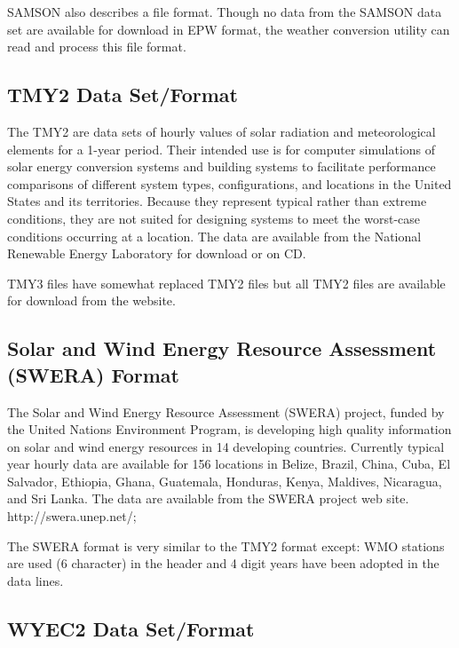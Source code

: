 SAMSON also describes a file format. Though no data from the SAMSON data set are available for download in EPW format, the weather conversion utility can read and process this file format.

\subsection{TMY2 Data Set/Format}\label{tmy2-data-setformat}

The TMY2 are data sets of hourly values of solar radiation and meteorological elements for a 1-year period. Their intended use is for computer simulations of solar energy conversion systems and building systems to facilitate performance comparisons of different system types, configurations, and locations in the United States and its territories. Because they represent typical rather than extreme conditions, they are not suited for designing systems to meet the worst-case conditions occurring at a location. The data are available from the National Renewable Energy Laboratory for download or on CD.

TMY3 files have somewhat replaced TMY2 files but all TMY2 files are available for download from the website.

\subsection{Solar and Wind Energy Resource Assessment (SWERA) Format}\label{solar-and-wind-energy-resource-assessment-swera-format}

The Solar and Wind Energy Resource Assessment (SWERA) project, funded by the United Nations Environment Program, is developing high quality information on solar and wind energy resources in 14 developing countries. Currently typical year hourly data are available for 156 locations in Belize, Brazil, China, Cuba, El Salvador, Ethiopia, Ghana, Guatemala, Honduras, Kenya, Maldives, Nicaragua, and Sri Lanka. The data are available from the SWERA project web site. http://swera.unep.net/;

The SWERA format is very similar to the TMY2 format except: WMO stations are used (6 character) in the header and 4 digit years have been adopted in the data lines.

\subsection{WYEC2 Data Set/Format}\label{wyec2-data-setformat}

